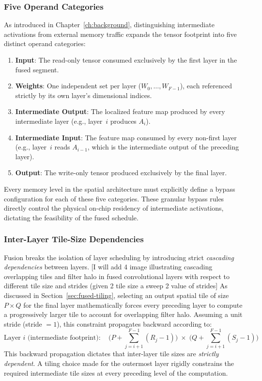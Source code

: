 \subsubsection{Five Operand Categories}
\label{sec:fds-five-operands}

As introduced in Chapter~\ref{ch:background}, distinguishing intermediate activations from external memory traffic expands the tensor footprint into five distinct operand categories:
\begin{enumerate}
  \item \textbf{Input}: The read-only tensor consumed exclusively by the first layer in the fused segment.
  \item \textbf{Weights}: One independent set per layer ($W_0, \dots, W_{F-1}$), each referenced strictly by its own layer's dimensional indices.
  \item \textbf{Intermediate Output}: The localized feature map produced by every intermediate layer (e.g., layer~$i$ produces $A_i$).
  \item \textbf{Intermediate Input}: The feature map consumed by every non-first layer (e.g., layer~$i$ reads $A_{i-1}$, which is the intermediate output of the preceding layer).
  \item \textbf{Output}: The write-only tensor produced exclusively by the final layer.
\end{enumerate}

Every memory level in the spatial architecture must explicitly define a bypass configuration for each of these five categories. These granular bypass rules directly control the physical on-chip residency of intermediate activations, dictating the feasibility of the fused schedule.

\subsubsection{Inter-Layer Tile-Size Dependencies}
\label{sec:fds-tile-deps}

Fusion breaks the isolation of layer scheduling by introducing strict \emph{cascading dependencies} between layers. 
[I will add 4 image illustrating cascading overlapping tiles and filter halo in fused convolutional layers with respect to different tile size and strides (given 2 tile size a sweep 2 value of strides] 
As discussed in Section~\ref{sec:fused-tiling}, selecting an output spatial tile of size $P \times Q$ for the final layer mathematically forces every preceding layer to compute a progressively larger tile to account for overlapping filter halo. Assuming a unit stride (stride $= 1$), this constraint propagates backward according to:
%
\begin{equation}
\label{eq:cascading-tiles-recap}
\text{Layer } i \text{ (intermediate footprint)}: \quad
  \Big(P + \sum_{j=i+1}^{F-1}(R_j - 1)\Big)
  \;\times\;
  \Big(Q + \sum_{j=i+1}^{F-1}(S_j - 1)\Big)
\end{equation}
%
This backward propagation dictates that inter-layer tile sizes are \emph{strictly dependent}. A tiling choice made for the outermost layer rigidly constrains the required intermediate tile sizes at every preceding level of the computation. 

